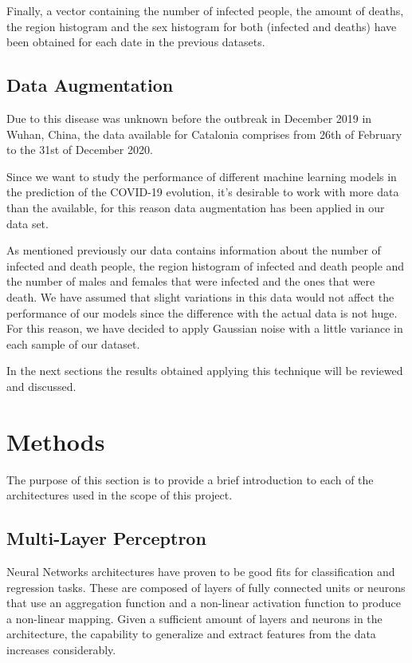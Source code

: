 \documentclass[anon]{CI}
\begin{document}
Finally, a vector containing the number of infected people, the amount of deaths, the region histogram and the sex histogram for both (infected and deaths) have been obtained for each date in the previous datasets.

\subsection{Data Augmentation}
Due to this disease was unknown before the outbreak in December 2019 in Wuhan, China, the data available for Catalonia comprises from 26th of February to the 31st of December 2020.

Since we want to study the performance of different machine learning models in the prediction of the COVID-19 evolution, it's desirable to work with more data than the available, for this reason data augmentation has been applied in our data set.

As mentioned previously our data contains information about the number of infected and death people, the region histogram of infected and death people and the number of males and females that were infected and the ones that were death. We have assumed that slight variations in this data would not affect the performance of our models since the difference with the actual data is not huge. For this reason, we have decided to apply Gaussian noise with a little variance in each sample of our dataset. 

In the next sections the results obtained applying this technique will be reviewed and discussed.

\section{Methods}

The purpose of this section is to provide a brief introduction to each of the architectures used in the scope of this project.

\subsection{Multi-Layer Perceptron}

Neural Networks architectures have proven to be good fits for classification and regression tasks. These are composed of layers of fully connected units or neurons that use an aggregation function and a non-linear activation function to produce a non-linear mapping. Given a sufficient amount of layers and neurons in the architecture, the capability to generalize and extract features from the data increases considerably.
\end{document}
